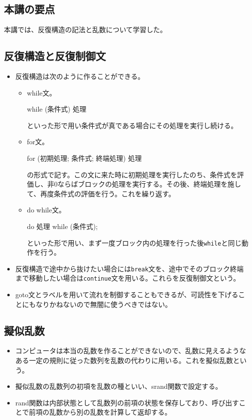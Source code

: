 \begin{shadebox}
\section*{本講の要点}
本講では、反復構造の記法と乱数について学習した。
\subsection*{反復構造と反復制御文}
\begin{itemize}
\item 反復構造は次のように作ることができる。
 \begin{itemize}
  \item while文。
\begin{code}
while (条件式) {
  処理
}
\end{code}
といった形で用い条件式が真である場合にその処理を実行し続ける。

  \item for文。
\begin{code}
for (初期処理; 条件式; 終端処理) {
  処理
}
\end{code}
の形式で記す。この文に来た時に初期処理を実行したのち、条件式を評価し、非0ならばブロックの処理を実行する。その後、終端処理を施して、再度条件式の評価を行う。これを繰り返す。

  \item do while文。
\begin{code}
do {
  処理
} while (条件式); 
\end{code}
といった形で用い、まず一度ブロック内の処理を行った後\verb|while|と同じ動作を行う。
 \end{itemize}
 \item 反復構造で途中から抜けたい場合には\verb|break|文を、途中でそのブロック終端まで移動したい場合は\verb|continue|文を用いる。これらを反復制御文という。
 \item goto文とラベルを用いて流れを制御することもできるが、可読性を下げることにもなりかねないので無闇に使うべきではない。
\end{itemize}

\subsection*{擬似乱数}
\begin{itemize}
\item コンピュータは本当の乱数を作ることができないので、乱数に見えるようなある一定の規則に従った数列を乱数の代わりに用いる。これを擬似乱数という。
\item 擬似乱数の乱数列の初項を乱数の種といい、srand関数で設定する。
\item rand関数は内部状態として乱数列の前項の状態を保存しており、呼び出すことで前項の乱数から別の乱数を計算して返却する。
\end{itemize}
\end{shadebox}
